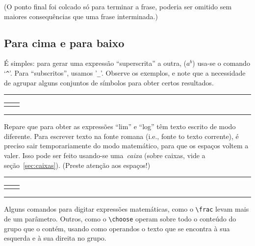 (O ponto final foi colcado só para terminar a frase, poderia ser
omitido sem maiores consequências que uma frase interminada.)

\subsection[Índices e expoentes]{Para cima e para baixo}

É simples: para gerar uma expressão ``superscrita'' a outra, ($a^b$)
usa-se o comando `\verb'^''. Para ``subscritos'', usamos
'\verb'_''. Observe os exemplos, e note que a necessidade de agrupar
alguns conjuntos de símbolos para obter certos resultados.

\medskip
\begin{center}\hrule\smallskip\footnotesize
\begin{tabular}{c|c}
\begin{minipage}{.405\textwidth}\footnotesize

\end{minipage} &
\begin{minipage}{.535\textwidth}\setlength{\parindent}{1pc}

\end{minipage}
\end{tabular}
\smallskip\hrule
\end{center}
\medskip

Repare que para obter as expressões ``lim'' e ``log'' têm texto
escrito de modo diferente. Para  escrever texto na fonte romana
(i.e., fonte to texto corrente), é preciso sair temporariamente do
modo matemático, para que os espaços voltem a valer. Isso pode ser
feito usando-se uma~\emph{caixa} (sobre caixas, vide a
seção~\ref{sec:caixas}). (Preste atenção aos espaços!)

\medskip
\begin{center}\hrule\smallskip
\begin{tabular}{c|c}
\begin{minipage}{.405\textwidth}\footnotesize

\end{minipage} &
\begin{minipage}{.535\textwidth}\setlength{\parindent}{1pc}

\end{minipage}
\end{tabular}
\smallskip\hrule
\end{center}
\medskip

Alguns comandos para digitar expressões matemáticas, como o
\verb'\frac' levam mais de um parâmetro. Outros, como o \verb'\choose'
operam sobre todo o conteúdo do grupo que o contém, usando como
operandos o texto que se encontra à sua esquerda e à sua direita no
grupo.

